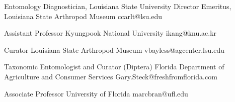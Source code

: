 \documentclass{article}
\begin{document}
{Entomology Diagnostician, Louisiana State University}
{Director Emeritus, Louisiana State Arthropod Museum}
{ccarlt@lsu.edu}

{Assistant Professor}
{Kyungpook National University}
{ikang@knu.ac.kr}

{Curator}
{Louisiana State Arthropod Museum}
{vbayless@agcenter.lsu.edu}

{Taxonomic Entomologist and Curator (Diptera)}
{Florida Department of Agriculture and Consumer Services}
{Gary.Steck@freshfromflorida.com}

{Associate Professor}
{University of Florida}
{marcbran@ufl.edu}
 
\end{document}
